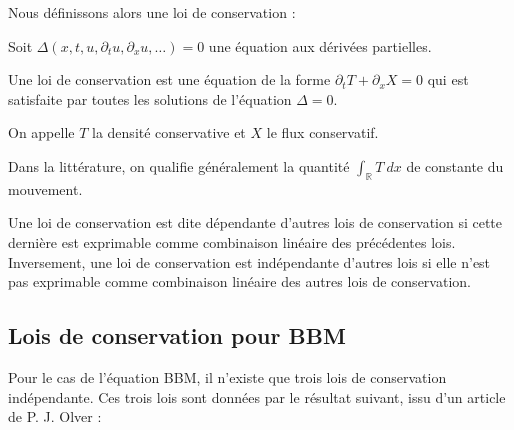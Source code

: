 Nous définissons alors une loi de conservation :
\begin{definitionbox}
\begin{definition}
    Soit $\Delta(x,t,u,\partial_tu, \partial_xu, \dots) = 0$ une équation aux dérivées partielles.

    \vspace{1em}
    Une loi de conservation est une équation de la forme $\partial_tT + \partial_x X =0$ qui est satisfaite par toutes les solutions de l'équation $\Delta = 0$.

    \vspace{1em}

    On appelle $T$ la densité conservative et $X$ le flux conservatif.
\end{definition}
\end{definitionbox}

Dans la littérature, on qualifie généralement la quantité $\int_{\mathbb{R}} T \ dx$ de constante du mouvement.


Une loi de conservation est dite dépendante d'autres lois de conservation si cette dernière est exprimable comme combinaison linéaire des précédentes lois. Inversement, une loi de conservation est indépendante d'autres lois si elle n'est pas exprimable comme combinaison linéaire des autres lois de conservation.

\subsection{Lois de conservation pour BBM}

Pour le cas de l'équation BBM, il n'existe que trois lois de conservation indépendante. Ces trois lois sont données par le résultat suivant, issu d'un article de P. J. Olver \cite{conservation} : 


